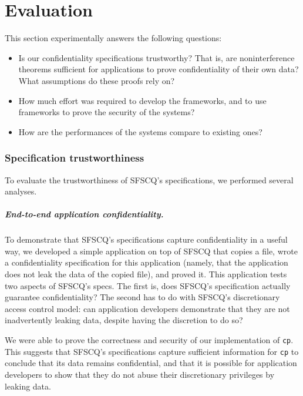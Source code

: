 \chapter{Evaluation}
This section experimentally answers the following questions:

\begin{itemize}

\item
  Is our confidentiality specifications trustworthy?  That is, are noninterference theorems sufficient for applications to prove confidentiality of their own data?
  What assumptions do these proofs rely on?

\item
  How much effort was required to develop the frameworks, and to use frameworks to prove the security of the systems?

\item 
  How are the performances of the systems compare to existing ones?
\end{itemize}

\subsection{Specification trustworthiness}

To evaluate the trustworthiness of SFSCQ's specifications, we performed several
analyses.


\paragraph{End-to-end application confidentiality.}

To demonstrate that SFSCQ's specifications capture confidentiality in
a useful way, we developed a simple application on top of SFSCQ that
copies a file, wrote a confidentiality specification for this application
(namely, that the application does not leak the data of the copied
file), and proved it.  This application tests two aspects of SFSCQ's
specs.  The first is, does SFSCQ's specification actually guarantee
confidentiality?  The second has to do with SFSCQ's discretionary access
control model: can application developers demonstrate that they are not
inadvertently leaking data, despite having the discretion to do so?

We were able to prove the correctness and security of our implementation
of \texttt{cp}.  This suggests that SFSCQ's specifications capture sufficient
information for \texttt{cp} to conclude that its data remains confidential,
and that it is possible for application developers to show that they do
not abuse their discretionary privileges by leaking data.



